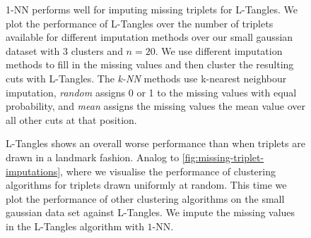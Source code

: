 \begin{figure}[ht]
    \centering
    \resizebox{0.7\textwidth}{!}{}
    \caption{
        1-NN performs well for imputing missing triplets for L-Tangles.
        We plot the performance of L-Tangles over the number of triplets available for different imputation methods over our small gaussian dataset with $3$ clusters
        and $n=20$. We use different imputation methods to fill in the missing values and then cluster the resulting cuts with L-Tangles.
        The \textit{k-NN} methods use k-nearest neighbour imputation, \textit{random} assigns 0 or 1 to the missing values with equal probability, and \textit{mean} assigns the missing
        values the mean value over all other cuts at that position.
    }
    \label{fig:missing-triplet-imputations}
\end{figure}

\begin{figure}[ht]
    \centering
    \resizebox{0.7\textwidth}{!}{}
    \caption{
        L-Tangles shows an overall worse performance than when triplets are drawn in a landmark fashion.
        Analog to \autoref{fig:missing-triplet-imputations}, where we visualise the performance of clustering algorithms for triplets drawn uniformly at random. 
        This time we plot the performance of other clustering algorithms on the small gaussian data set against L-Tangles.
        We impute the missing values in the L-Tangles algorithm with $1$-NN.
    }
    \label{fig:missing-triplet-performance}
\end{figure}




